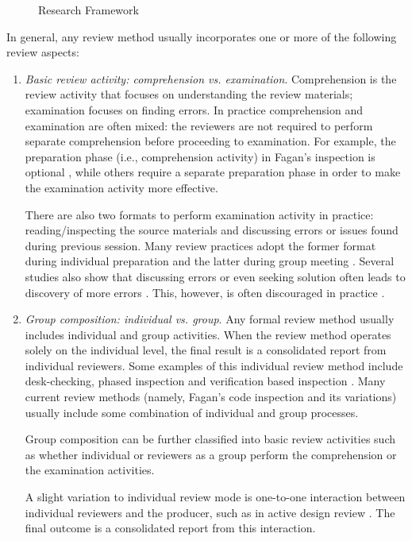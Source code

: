 \begin {itemize}
\begin{figure}[tb]
  {\centerline{}}
  \caption{Research Framework}
  \label{fig:research-framework}
\end{figure}


In general, any review method usually incorporates one or more of
the following review aspects:

\begin {enumerate}
\item {\sl Basic review activity: comprehension vs. examination}.
Comprehension is the review activity that focuses on understanding the
review materials; examination focuses on finding errors.  In practice
comprehension and examination are often mixed: the reviewers are not
required to perform separate comprehension before proceeding to
examination.  For example, the preparation phase (i.e., comprehension
activity) in Fagan's inspection is optional \cite{Fagan86}, while
others \cite{Humphrey90,Ackerman89,Russell91} require a separate
preparation phase in order to make the examination activity more
effective.

There are also two formats to perform examination activity in
practice: reading/inspecting the source materials and discussing
errors or issues found during previous session.  Many review practices
adopt the former format during individual preparation and the latter
during group meeting \cite{Humphrey90}.  Several studies also show
that discussing errors or even seeking solution often leads to
discovery of more errors \cite{Doolan92,Gilb88}. This, however, is
often discouraged in practice \cite{Fagan76}.

\item {\sl Group composition: individual vs. group}.  
Any formal review method usually includes individual and group
activities.  When the review method operates solely on the individual
level, the final result is a consolidated report from individual
reviewers.  Some examples of this individual review method include
desk-checking, phased inspection \cite{Knight91} and verification
based inspection \cite{Dyer90}.  Many current review methods (namely,
Fagan's code inspection and its variations) usually include some
combination of individual and group processes.

Group composition can be further classified into basic review
activities such as whether individual or reviewers as a group perform
the comprehension or the examination activities.

A slight variation to individual review mode is one-to-one interaction
between individual reviewers and the producer, such as in active
design review \cite{Parnas85}. The final outcome is a consolidated
report from this interaction.


\end{enumerate}
\end{itemize}
